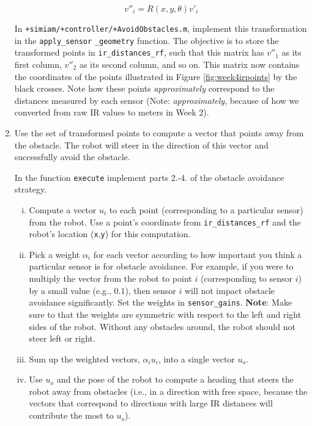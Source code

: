 \documentclass[10pt]{article}
\begin{document}
\begin{enumerate}
  \begin{equation*}
    v''_i = R(x,y,\theta)v'_i
  \end{equation*}
  
  In \texttt{+simiam/+controller/+AvoidObstacles.m}, implement this transformation in the \texttt{apply\_sensor} \texttt{\_geometry} function. The objective is to store the transformed points in \texttt{ir\_distances\_rf}, such that this matrix has $v''_1$ as its first column, $v''_2$ as its second column, and so on. This matrix now contains the coordinates of the points illustrated in Figure \ref{fig:week4irpoints} by the black crosses. Note how these points \textit{approximately} correspond to the distances measured by each sensor (Note: \textit{approximately}, because of how we converted from raw IR values to meters in Week 2).
  
  \item Use the set of transformed points to compute a vector that points away from the obstacle. The robot will steer in the direction of this vector and successfully avoid the obstacle.
  
  In the function \texttt{execute} implement parts 2.-4. of the obstacle avoidance strategy.
  \begin{enumerate}[(i)]
    \item Compute a vector $u_i$ to each point (corresponding to a particular sensor) from the robot. Use a point's coordinate from \texttt{ir\_distances\_rf} and the robot's location (\texttt{x},\texttt{y}) for this computation.
    \item Pick a weight $\alpha_i$ for each vector according to how important you think a particular sensor is for obstacle avoidance. For example, if you were to multiply the vector from the robot to point $i$ (corresponding to sensor $i$) by a small value (e.g., $0.1$), then sensor $i$ will not impact obstacle avoidance significantly. Set the weights in \texttt{sensor\_gains}. \textbf{Note}: Make sure to that the weights are symmetric with respect to the left and right sides of the robot. Without any obstacles around, the robot should not steer left or right.
    \item Sum up the weighted vectors, $\alpha_iu_i$, into a single vector $u_o$.
    \item Use $u_o$ and the pose of the robot to compute a heading that steers the robot away from obstacles (i.e., in a direction with free space, because the vectors that correspond to directions with large IR distances will contribute the most to $u_o$).    
  \end{enumerate} 
\end{enumerate}
\end{document}
